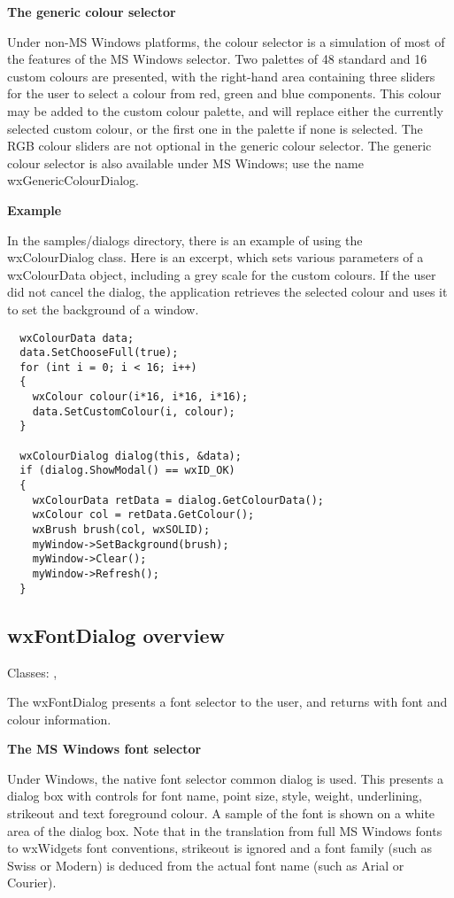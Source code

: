 {\bf The generic colour selector}

Under non-MS Windows platforms, the colour selector is a simulation of
most of the features of the MS Windows selector. Two palettes of 48
standard and 16 custom colours are presented, with the right-hand area
containing three sliders for the user to select a colour from red,
green and blue components. This colour may be added to the custom colour
palette, and will replace either the currently selected custom colour,
or the first one in the palette if none is selected. The RGB colour sliders
are not optional in the generic colour selector. The generic colour
selector is also available under MS Windows; use the name
wxGenericColourDialog.

{\bf Example}

In the samples/dialogs directory, there is an example of using
the wxColourDialog class. Here is an excerpt, which
sets various parameters of a wxColourData object, including
a grey scale for the custom colours. If the user did not cancel
the dialog, the application retrieves the selected colour and
uses it to set the background of a window.

\begin{verbatim}
  wxColourData data;
  data.SetChooseFull(true);
  for (int i = 0; i < 16; i++)
  {
    wxColour colour(i*16, i*16, i*16);
    data.SetCustomColour(i, colour);
  }
      
  wxColourDialog dialog(this, &data);
  if (dialog.ShowModal() == wxID_OK)
  {
    wxColourData retData = dialog.GetColourData();
    wxColour col = retData.GetColour();
    wxBrush brush(col, wxSOLID);
    myWindow->SetBackground(brush);
    myWindow->Clear();
    myWindow->Refresh();
  }
\end{verbatim}


\subsection{wxFontDialog overview}\label{wxfontdialogoverview}

Classes: , 

The wxFontDialog presents a font selector to the user, and returns
with font and colour information.

{\bf The MS Windows font selector}

Under Windows, the native font selector common dialog is used. This
presents a dialog box with controls for font name, point size, style, weight,
underlining, strikeout and text foreground colour. A sample of the
font is shown on a white area of the dialog box. Note that
in the translation from full MS Windows fonts to wxWidgets font
conventions, strikeout is ignored and a font family (such as
Swiss or Modern) is deduced from the actual font name (such as Arial
or Courier).

